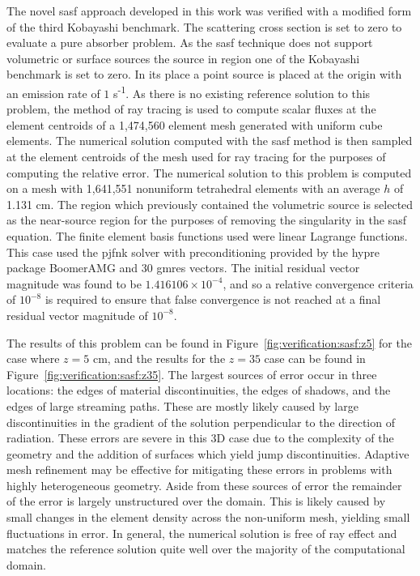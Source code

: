 The novel \acrshort{sasf} approach developed in this work was verified with a modified form of the third Kobayashi benchmark. The scattering cross section is set to zero to evaluate a pure absorber problem. As the \acrshort{sasf} technique does not support volumetric or surface sources the source in region one of the Kobayashi benchmark is set to zero. In its place a point source is placed at the origin with an emission rate of $1$ s\textsuperscript{-1}. As there is no existing reference solution to this problem, the method of ray tracing is used to compute scalar fluxes at the element centroids of a 1,474,560 element mesh generated with uniform cube elements. The numerical solution computed with the \acrshort{sasf} method is then sampled at the element centroids of the mesh used for ray tracing for the purposes of computing the relative error. The numerical solution to this problem is computed on a mesh with 1,641,551 nonuniform tetrahedral elements with an average $h$ of 1.131 cm. The region which previously contained the volumetric source is selected as the near-source region for the purposes of removing the singularity in the \acrshort{sasf} equation. The finite element basis functions used were linear Lagrange functions. This case used the \acrshort{pjfnk} solver with preconditioning provided by the hypre package BoomerAMG and 30 \acrshort{gmres} vectors. The initial residual vector magnitude was found to be $1.416106\times 10^{-4}$, and so a relative convergence criteria of $10^{-8}$ is required to ensure that false convergence is not reached at a final residual vector magnitude of $10^{-8}$. 

The results of this problem can be found in Figure~\ref{fig:verification:sasf:z5} for the case where $z = 5$ cm, and the results for the $z = 35$ case can be found in Figure~\ref{fig:verification:sasf:z35}. The largest sources of error occur in three locations: the edges of material discontinuities, the edges of shadows, and the edges of large streaming paths. These are mostly likely caused by large discontinuities in the gradient of the solution perpendicular to the direction of radiation. These errors are severe in this 3D case due to the complexity of the geometry and the addition of surfaces which yield jump discontinuities. Adaptive mesh refinement may be effective for mitigating these errors in problems with highly heterogeneous geometry. Aside from these sources of error the remainder of the error is largely unstructured over the domain. This is likely caused by small changes in the element density across the non-uniform mesh, yielding small fluctuations in error. In general, the numerical solution is free of ray effect and matches the reference solution quite well over the majority of the computational domain.

